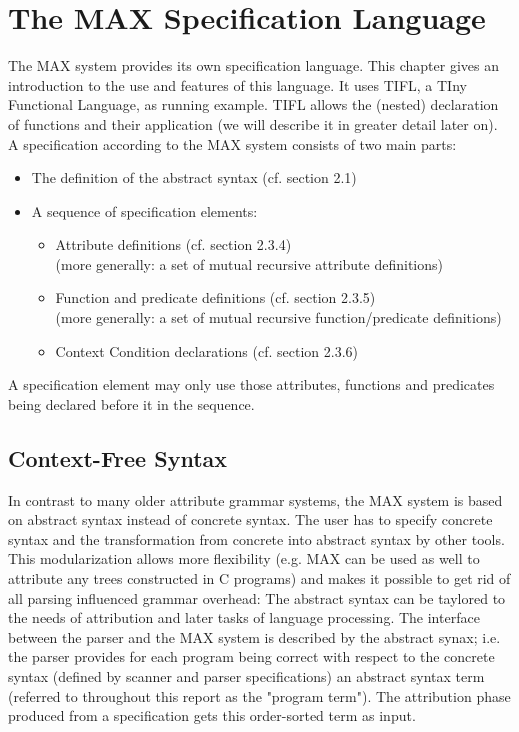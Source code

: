 
\chapter{The MAX Specification Language}
The MAX system provides its own specification language. This chapter gives an introduction to the use and features of this language. It uses TIFL, a TIny Functional Language, as running example. TIFL allows the (nested) declaration of functions and their application (we will describe it in greater detail later on).\\
A specification according to the MAX system consists of two main parts:
\begin{itemize}
\item The definition of the abstract syntax (cf. section 2.1)
\item A sequence of specification elements:

  \begin{itemize}
  \item Attribute definitions (cf. section 2.3.4)\\
(more generally: a set of mutual recursive attribute definitions)
  \item Function and predicate definitions (cf. section 2.3.5)\\
(more generally: a set of mutual recursive function/predicate definitions)  
  \item Context Condition declarations (cf. section 2.3.6)

  \end{itemize}

\end{itemize}
\noindent
A specification element may only use those attributes, functions and predicates being declared before it in the sequence.\\

\section{Context-Free Syntax}

In contrast to many older attribute grammar systems, the MAX system is
based on abstract syntax instead of concrete syntax. The user has to
specify concrete syntax and the transformation from concrete into
abstract syntax by other tools. This modularization allows more 
flexibility (e.g. MAX can be used as well to attribute any trees 
constructed in C programs) and makes it possible to get rid of all
parsing influenced grammar overhead: The abstract syntax can be taylored
to the needs of attribution and later tasks of language processing.
\noindent
The interface between the parser and the MAX system is described by the 
abstract synax; i.e. the parser provides for each program being correct
with respect to the concrete syntax (defined by scanner and parser 
specifications) an abstract syntax term (referred to 
throughout this report as the "program term"). The attribution phase
produced from a specification gets this order-sorted term as input.

